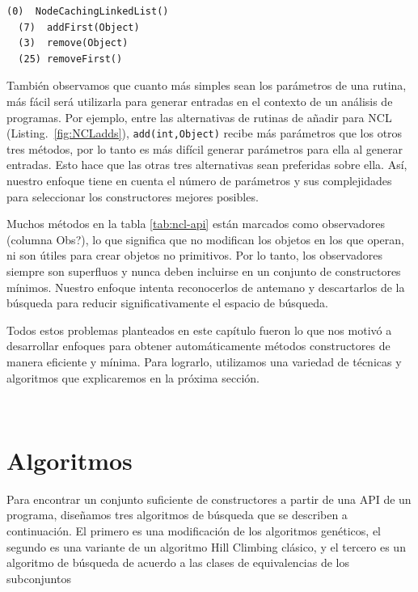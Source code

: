 \begin{lstlisting}[numbers=none,label=fig:NCLadds, caption= Conjuntos de metodos builders suficientes pero no mínimos, captionpos=b, frame=tb , basicstyle=\scriptsize]
  (0)  NodeCachingLinkedList()
  (7)  addFirst(Object)
  (3)  remove(Object)
  (25) removeFirst()
\end{lstlisting}

También observamos que cuanto más simples sean los parámetros de una rutina, más fácil será utilizarla para generar entradas en el contexto de un análisis de programas. Por ejemplo, entre las alternativas de rutinas de añadir para NCL (Listing.~\ref{fig:NCLadds}), \texttt{add(int,Object)} recibe más parámetros que los otros tres métodos, por lo tanto es más difícil generar parámetros para ella al generar entradas. Esto hace que las otras tres alternativas sean preferidas sobre ella. Así, nuestro enfoque tiene en cuenta el número de parámetros y sus complejidades para seleccionar los constructores mejores posibles.

Muchos métodos en la tabla \ref{tab:ncl-api} están marcados como observadores (columna Obs?), lo que significa que no modifican los objetos en los que operan, ni son útiles para crear objetos no primitivos. Por lo tanto, los observadores siempre son superfluos y nunca deben incluirse en un conjunto de constructores mínimos. Nuestro enfoque intenta reconocerlos de antemano y descartarlos de la búsqueda para reducir significativamente el espacio de búsqueda.

Todos estos problemas planteados en este capítulo fueron lo que nos motivó a desarrollar enfoques para obtener automáticamente métodos constructores de manera eficiente y mínima. Para lograrlo, utilizamos una variedad de técnicas y algoritmos que explicaremos en la próxima sección. 

\\

\section{Algoritmos}
Para encontrar un conjunto suficiente de constructores a partir de una API de un programa, diseñamos tres algoritmos de búsqueda que se describen a continuación. El primero es una modificación de los algoritmos genéticos, el segundo es una variante de un algoritmo Hill Climbing clásico, y el tercero es un algoritmo de búsqueda de acuerdo a las clases de equivalencias de los subconjuntos

